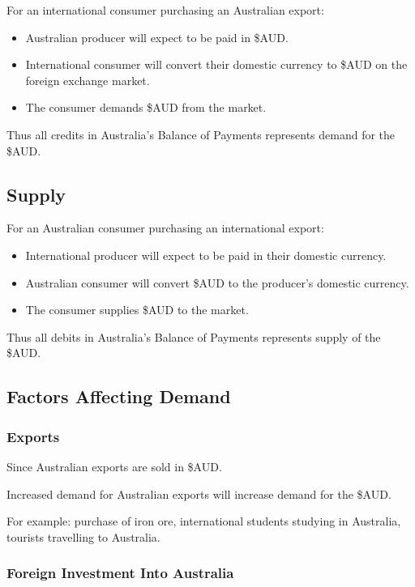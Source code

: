 \documentclass[a4paper,11pt]{report}
\begin{document}
For an international consumer purchasing an Australian export:

\begin{itemize}
\item Australian producer will expect to be paid in \$AUD.
\item International consumer will convert their domestic currency to \$AUD on
	the foreign exchange market.
\item The consumer demands \$AUD from the market.
\end{itemize}

Thus all credits in Australia's Balance of Payments represents demand for the
\$AUD.

\subsection{Supply}

For an Australian consumer purchasing an international export:

\begin{itemize}
\item International producer will expect to be paid in their domestic currency.
\item Australian consumer will convert \$AUD to the producer's domestic
	currency.
\item The consumer supplies \$AUD to the market.
\end{itemize}

Thus all debits in Australia's Balance of Payments represents supply of the
\$AUD.

\subsection{Factors Affecting Demand}

\subsubsection{Exports}

Since Australian exports are sold in \$AUD.

Increased demand for Australian exports will increase demand for the \$AUD.

For example: purchase of iron ore, international students studying in Australia,
tourists travelling to Australia.

\subsubsection{Foreign Investment Into Australia}
\end{document}
